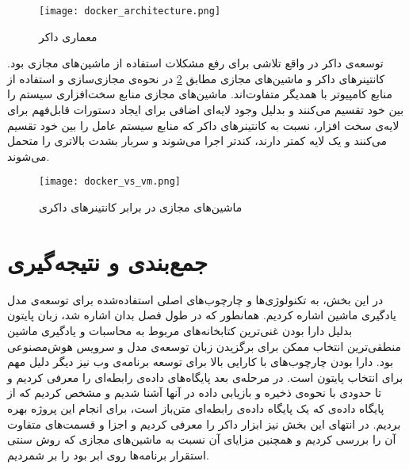 \begin{figure}[!h]
\centerline{\texttt{[image: docker\_architecture.png]}}
\caption{معماری داکر\cite{dockerDockerOverview}}
\label{fig:docker_architecture}
\end{figure}

توسعه‌ی داکر در واقع تلاشی برای رفع مشکلات استفاده از ماشین‌های مجازی بود. کانتینرهای داکر و ماشین‌های مجازی مطابق \cref{fig:docker_vs_vm} در نحوه‌ی مجازی‌سازی و استفاده از منابع کامپیوتر با همدیگر متفاوت‌اند. ماشین‌های مجازی منابع سخت‌افزاری سیستم را بین خود تقسیم می‌کنند و بدلیل وجود لایه‌ای اضافی برای ایجاد دستورات قابل‌فهم برای لایه‌ی سخت افزار، نسبت به کانتینرهای داکر که منابع سیستم عامل را بین خود تقسیم می‌کنند و یک لایه کمتر دارند، کندتر اجرا می‌شوند و سربار بشدت بالاتری را متحمل می‌شوند\cite{anderson2015docker, yadav2019docker}.

\begin{figure}[!h]
\centerline{\texttt{[image: docker\_vs\_vm.png]}}
\caption{ماشین‌های مجازی در برابر کانتینرهای داکری\cite{yadav2019docker}}
\label{fig:docker_vs_vm}
\end{figure}

\section{جمع‌بندی و نتیجه‌گیری}
در این بخش، به تکنولوژی‌ها و چارچوب‌های اصلی استفاده‌شده برای توسعه‌ی مدل یادگیری ماشین اشاره کردیم. همانطور که در طول فصل بدان اشاره شد، زبان پایتون بدلیل دارا بودن غنی‌ترین کتابخانه‌های مربوط به محاسبات و یادگیری ماشین منطقی‌ترین انتخاب ممکن برای برگزیدن زبان توسعه‌ی مدل و سرویس هوش‌مصنوعی بود. دارا بودن چارچوب‌های با کارایی بالا برای توسعه برنامه‌ی وب نیز دیگر دلیل مهم برای انتخاب پایتون است. در مرحله‌ی بعد پایگاه‌های داده‌ی رابطه‌ای را معرفی کردیم و تا حدودی با نحوه‌ی ذخیره‌ و بازیابی داده در آنها آشنا شدیم و مشخص کردیم که از پایگاه داده‌ی  که یک پایگاه‌ داده‌ی رابطه‌ای متن‌باز است، برای انجام این پروژه بهره‌ بردیم. در انتهای این بخش نیز ابزار داکر را معرفی کردیم و اجزا و قسمت‌های متفاوت آن را بررسی کردیم و همچنین مزایای آن نسبت به ماشین‌های مجازی که روش سنتی استقرار برنامه‌ها روی ابر بود را بر شمردیم.  